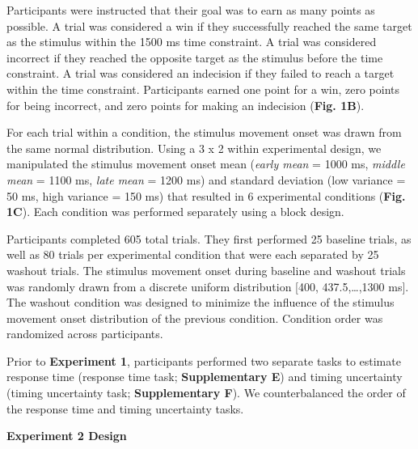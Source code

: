 \documentclass[12pt]{article}
\newcommand\boldblue[1]{\textcolor{mydarkblue}{\textbf{#1}}}
\begin{document}
Participants were instructed that their goal was to earn as many points as possible. A trial was considered a win if they successfully reached the same target as the stimulus within the 1500 ms time constraint. A trial was considered incorrect if they reached the opposite target as the stimulus before the time constraint. A trial was considered an indecision if they failed to reach a target within the time constraint. Participants earned one point for a win, zero points for being incorrect, and zero points for making an indecision (\boldblue{Fig. 1B}).

For each trial within a condition, the stimulus movement onset was drawn from the same normal distribution. Using a 3 x 2 within experimental design, we manipulated the stimulus movement onset mean (\emph{early mean} = 1000 ms, \emph{middle mean} = 1100 ms, \emph{late mean} = 1200 ms) and standard deviation (low variance = 50 ms, high variance = 150 ms) that resulted in 6 experimental conditions (\boldblue{Fig. 1C}).  Each condition was performed separately using a block design.

Participants completed 605 total trials. They first performed 25 baseline trials, as well as 80 trials per experimental condition that were each separated by 25 washout trials. The stimulus movement onset during baseline and washout trials was randomly drawn from a discrete uniform distribution [400, 437.5,…,1300 ms]. The washout condition was designed to minimize the influence of the stimulus movement onset distribution of the previous condition. Condition order was randomized across participants.

Prior to \boldblue{Experiment 1}, participants performed two separate tasks to estimate response time (response time task; \boldblue{Supplementary E}) and timing uncertainty (timing uncertainty task; \boldblue{Supplementary F}). We counterbalanced the order of the response time and timing uncertainty tasks.

\vspace{2mm}
\noindent\boldblue{\large Experiment 2 Design}
\end{document}
